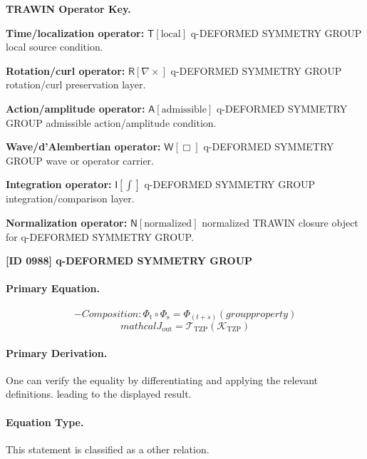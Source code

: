 \par\vspace{0.45\baselineskip}
\noindent\begin{minipage}[t]{\linewidth}
\begingroup
\small
\raggedright
\textbf{TRAWIN Operator Key.}\par
\noindent\textbf{Time/localization operator:} $\mathsf{T}\!\left[\mathrm{local}\right]$ q-DEFORMED SYMMETRY GROUP local source condition.\par
\noindent\textbf{Rotation/curl operator:} $\mathsf{R}\!\left[\nabla\times\right]$ q-DEFORMED SYMMETRY GROUP rotation/curl preservation layer.\par
\noindent\textbf{Action/amplitude operator:} $\mathsf{A}\!\left[\mathrm{admissible}\right]$ q-DEFORMED SYMMETRY GROUP admissible action/amplitude condition.\par
\noindent\textbf{Wave/d'Alembertian operator:} $\mathsf{W}\!\left[\Box\right]$ q-DEFORMED SYMMETRY GROUP wave or operator carrier.\par
\noindent\textbf{Integration operator:} $\mathsf{I}\!\left[\int\right]$ q-DEFORMED SYMMETRY GROUP integration/comparison layer.\par
\noindent\textbf{Normalization operator:} $\mathsf{N}\!\left[\mathrm{normalized}\right]$ normalized TRAWIN closure object for q-DEFORMED SYMMETRY GROUP.\par
\endgroup
\end{minipage}

\clearpage
\noindent\textbf{[ID 0988] q-DEFORMED SYMMETRY GROUP}\par
\vspace{0.35em}
\paragraph{Primary Equation.}
\[
- Composition: \Phi_{\mathrm{t}} \circ \Phi_{\mathrm{s}} = \Phi_(t+s) (group property)
\]
\[
mathcal{J}_{\mathrm{out}} = \mathcal{T}_{\mathrm{TZP}}\!\left(\mathcal{K}_{\mathrm{TZP}}\right)
\]

\paragraph{Primary Derivation.}
One can verify the equality by differentiating and applying the relevant definitions. leading to the displayed result.
\paragraph{Equation Type.}
This statement is classified as a other relation.

